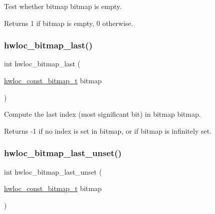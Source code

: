 Test whether bitmap {\ttfamily bitmap} is empty. 

\begin{DoxyReturn}{Returns}
1 if bitmap is empty, 0 otherwise. 
\end{DoxyReturn}
\mbox{\label{a00205_ga3d9b08b060a59bbab5a4ea6d0a1ed7a6}} 
\subsubsection{\texorpdfstring{hwloc\+\_\+bitmap\+\_\+last()}{hwloc\_bitmap\_last()}}
{\footnotesize\ttfamily int hwloc\+\_\+bitmap\+\_\+last (\begin{DoxyParamCaption}\item[{\hyperlink{a00205_gae991a108af01d408be2776c5b2c467b2}{hwloc\+\_\+const\+\_\+bitmap\+\_\+t}}]{bitmap }\end{DoxyParamCaption})}



Compute the last index (most significant bit) in bitmap {\ttfamily bitmap}. 

\begin{DoxyReturn}{Returns}
-\/1 if no index is set in {\ttfamily bitmap}, or if {\ttfamily bitmap} is infinitely set. 
\end{DoxyReturn}
\mbox{\label{a00205_ga45d49aeb45c7da631b1480a93dc3fc92}} 
\subsubsection{\texorpdfstring{hwloc\+\_\+bitmap\+\_\+last\+\_\+unset()}{hwloc\_bitmap\_last\_unset()}}
{\footnotesize\ttfamily int hwloc\+\_\+bitmap\+\_\+last\+\_\+unset (\begin{DoxyParamCaption}\item[{\hyperlink{a00205_gae991a108af01d408be2776c5b2c467b2}{hwloc\+\_\+const\+\_\+bitmap\+\_\+t}}]{bitmap }\end{DoxyParamCaption})}



